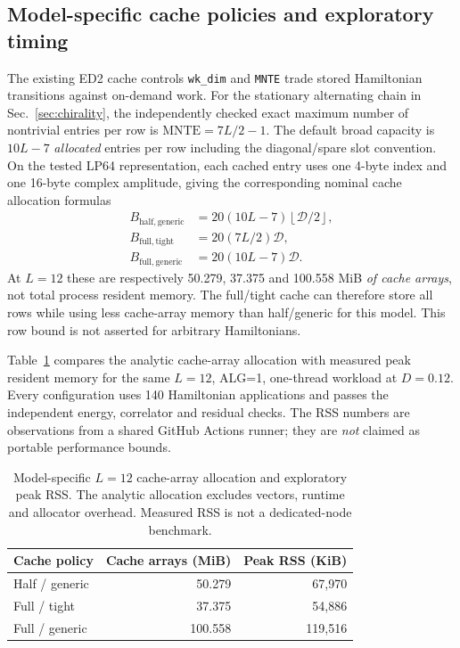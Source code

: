 \documentclass[preprint,12pt,nopreprintline]{elsarticle}
\begin{document}
\subsection{Model-specific cache policies and exploratory timing}
The existing ED2 cache controls \texttt{wk\_dim} and \texttt{MNTE}
trade stored Hamiltonian transitions against on-demand work.
For the stationary alternating chain in Sec.~\ref{sec:chirality},
the independently checked exact maximum number of nontrivial
entries per row is $\mathrm{MNTE}=7L/2-1$.
The default broad capacity is $10L-7$ \emph{allocated}
entries per row including the diagonal/spare slot convention.
On the tested LP64 representation, each cached
entry uses one 4-byte index and one 16-byte complex
amplitude, giving the corresponding nominal cache
allocation formulas
\begin{align}
B_{\mathrm{half,generic}}&=
20(10L-7)\left\lfloor\mathcal D/2\right\rfloor,\nonumber\\
B_{\mathrm{full,tight}}&=
20(7L/2)\mathcal D,\nonumber\\
B_{\mathrm{full,generic}}&=
20(10L-7)\mathcal D.
\label{eq:cache}
\end{align}
At $L=12$ these are respectively 50.279,
37.375 and 100.558 MiB \emph{of cache arrays},
not total process resident memory.
The full/tight cache can therefore store all rows while
using less cache-array memory than half/generic for this model.
This row bound is not asserted for arbitrary Hamiltonians.


Table~\ref{tab:cache-resource} compares the analytic
cache-array allocation with measured peak resident memory
for the same $L=12$, ALG=1, one-thread workload at
$D=0.12$. Every configuration uses 140 Hamiltonian
applications and passes the independent energy,
correlator and residual checks. The RSS numbers are
observations from a shared GitHub Actions runner;
they are \emph{not} claimed as portable performance bounds.

\begin{table}[t]
\centering
\caption{Model-specific $L=12$ cache-array allocation
and exploratory peak RSS. The analytic allocation
excludes vectors, runtime and allocator overhead.
Measured RSS is not a dedicated-node benchmark.}
\label{tab:cache-resource}
\small
\begin{tabular}{lrr}
\toprule
Cache policy & Cache arrays (MiB) & Peak RSS (KiB) \\
\midrule
Half / generic & 50.279 & 67,970\\
Full / tight & 37.375 & 54,886\\
Full / generic & 100.558 & 119,516\\
\bottomrule
\end{tabular}
\end{table}
\end{document}
